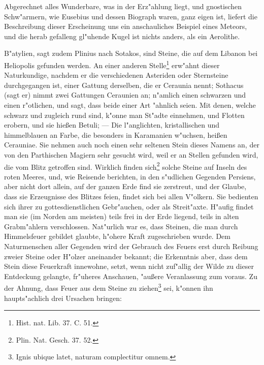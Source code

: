 \documentclass[a4paper, 11pt, oneside, polutonikogreek, german]{article}
\begin{document}
Abgerechnet alles Wunderbare, was in der Erz"ahlung liegt, und gnostischen Schw"armern, wie Eusebius und dessen Biograph waren, ganz eigen ist, liefert die Beschreibung dieser Erscheinung uns ein anschauliches Beispiel eines Meteors, und die herab gefalleng gl"uhende Kugel ist nichts anders, als ein Aerolithe.

B"atylien, sagt zudem Plinius nach Sotakos, sind Steine, die auf dem Libanon bei Heliopolis gefunden werden. An einer anderen Stelle\footnote{Hist. nat. Lib. 37. C. 51.} erw"ahnt dieser Naturkundige, nachdem er die verschiedenen Asteriden oder Sternsteine durchgegangen ist, einer Gattung derselben, die er Ceraunia nennt; Sothacus (sagt er) nimmt zwei Gattungen Ceraunien an; n"amlich einen schwarzen und einen r"otlichen, und sagt, dass beide einer Art "ahnlich seien. Mit denen, welche schwarz und zugleich rund sind, k"onne man St"adte einnehmen, und Flotten erobern, und sie hießen Betuli; --- Die l"anglichten, kristallischen und himmelblauen an Farbe, die besonders in Karamanien w"uchsen, heißen Cerauniae. Sie nehmen auch noch einen sehr seltenen Stein dieses Namens an, der von den Parthischen Magiern sehr gesucht wird, weil er an Stellen gefunden wird, die vom Blitz getroffen sind. Wirklich finden sich\footnote{Plin. Nat. Gesch. 37. 52.} solche Steine auf Inseln des roten Meeres, und, wie Reisende berichten, in den s"udlichen Gegenden Persiens, aber nicht dort allein, auf der ganzen Erde find sie zerstreut, und der Glaube, dass sie Erzeugnisse des Blitzes feien, findet sich bei allen V"olkern. Sie bedienten sich ihrer zu gottesdienstlichen Gebr"auchen, oder als Streit"axte. H"aufig findet man sie (im Norden am meisten) teils frei in der Erde liegend, teils in alten Grabm"ahlern verschlossen. Nat"urlich war es, dass Steinen, die man durch Himmelsfeuer gebildet glaubte, h"ohere Kraft zugeschrieben wurde. Dem Naturmenschen aller Gegenden wird der Gebrauch des Feuers erst durch Reibung zweier Steine oder H"olzer aneinander bekannt; die Erkenntnis aber, dass dem Stein diese Feuerkraft innewohne, setzt, wenn nicht zuf"allig der Wilde zu dieser Entdeckung gelangte, fr"uheres Anschauen, "außere Veranlassung zum voraus. Zu der Ahnung, dass Feuer aus dem Steine zu ziehen\footnote{Ignis ubique latet, naturam complectitur omnem.} sei, k"onnen ihn haupts"achlich drei Ursachen bringen:
\end{document}
